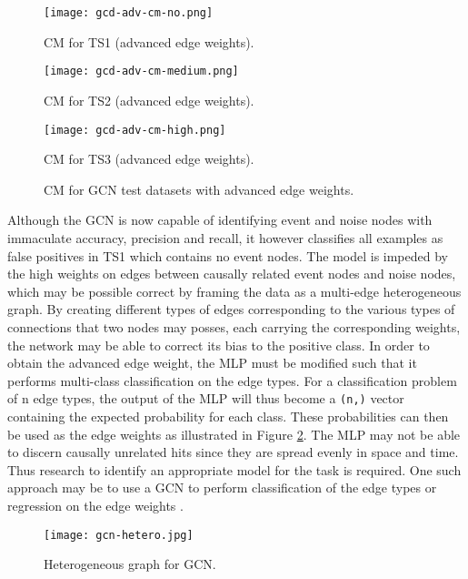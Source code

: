 \begin{figure}[htb]
  \centering
    \begin{minipage}{0.32\textwidth}
    \centering
    \texttt{[image: gcd-adv-cm-no.png]}
    \caption{CM for TS1 (advanced edge weights).}
  \end{minipage}
  \begin{minipage}{0.32\textwidth}
    \centering
    \texttt{[image: gcd-adv-cm-medium.png]}
    \caption{CM for TS2 (advanced edge weights).}
  \end{minipage}
  \begin{minipage}{0.32\textwidth}
    \centering
    \texttt{[image: gcd-adv-cm-high.png]}
    \caption{CM for TS3 (advanced edge weights).}
  \end{minipage}
  \caption{CM for GCN test datasets with advanced edge weights.}
  \label{fig:gcn-cm-adv}
\end{figure}

Although the GCN is now capable of identifying event and noise nodes
with immaculate accuracy, precision and recall, it however classifies
all examples as false positives in TS1 which contains no event nodes.
The model is impeded by the high weights on edges between causally
related event nodes and noise nodes, which may be possible correct by
framing the data as a multi-edge heterogeneous graph. By creating
different types of edges corresponding to the various types of
connections that two nodes may posses, each carrying the corresponding
weights, the network may be able to correct its bias to the positive
class. In order to obtain the advanced edge weight, the MLP must be
modified such that it performs multi-class classification on the edge
types. For a classification problem of n edge types, the output of the
MLP will thus become a \texttt{(n,)} vector containing the expected
probability for each class. These probabilities can then be used as
the edge weights as illustrated in Figure \ref{fig:gcn-hetero}. The
MLP may not be able to discern causally unrelated hits since they are
spread evenly in space and time. Thus research to identify an
appropriate model for the task is required. One such approach may be
to use a GCN to perform classification of the edge types or regression
on the edge weights \cite{gong2019exploiting}.

\begin{figure}[htb]
  \centering
  \texttt{[image: gcn-hetero.jpg]}
  \caption{Heterogeneous graph for GCN.}
  \label{fig:gcn-hetero}
\end{figure}

